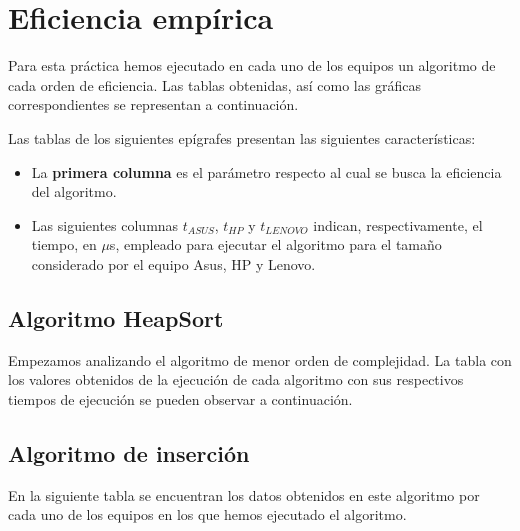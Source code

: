\documentclass{homework}
\begin{document}
    \section{Eficiencia empírica}

    Para esta práctica hemos ejecutado en cada uno de los equipos un algoritmo de cada orden de eficiencia.
    Las tablas obtenidas, así como las gráficas correspondientes se representan a continuación.

    Las tablas de los siguientes epígrafes presentan las siguientes características:

    \begin{itemize}
        \item La \textbf{primera columna} es el parámetro respecto al cual se busca la eficiencia del algoritmo.
        \item Las siguientes columnas $t_{ASUS}$, $t_{HP}$ y $t_{LENOVO}$ indican, respectivamente, el tiempo, en $\mu$s, empleado para ejecutar el algoritmo para el 
        tamaño considerado por el equipo Asus, HP y Lenovo.
    \end{itemize}

    \newpage

    \subsection{Algoritmo HeapSort}

    Empezamos analizando el algoritmo de menor orden de complejidad. La tabla con los valores obtenidos de la ejecución
    de cada algoritmo con sus respectivos tiempos de ejecución se pueden observar a continuación.

    

    \newpage
    
    \subsection{Algoritmo de inserción}
    
    En la siguiente tabla se encuentran los datos obtenidos en este algoritmo por cada uno de los
    equipos en los que hemos ejecutado el algoritmo. 
    
\end{document}

